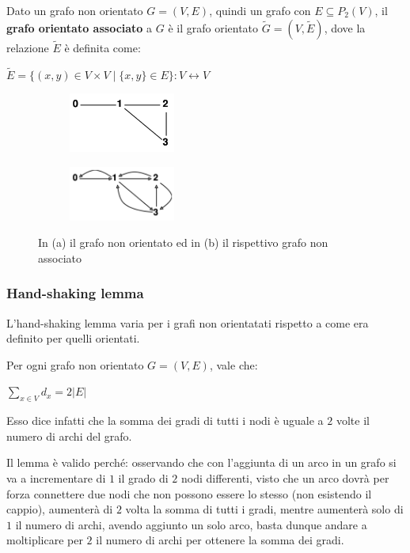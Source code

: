 \begin{definition}
    Dato un grafo non orientato $G = (V,E)$, quindi un grafo con $E \subseteq P_2(V)$, il \textbf{grafo orientato associato} a $G$ è il grafo orientato $\widetilde{G} = (V, \widetilde{E})$, dove la relazione $\widetilde{E}$ è definita come:
    \begin{center}
        $\widetilde{E} = \{(x,y) \in V \times V \mid \{x,y\} \in E\}: V \leftrightarrow V$
    \end{center}
\end{definition}

\begin{figure}[h!]
    \centering
    \begin{subfigure}{.3\textwidth}
        \centering
        \includegraphics[width=3.5cm]{images/grafo-non-orientato.png}
        \vspace{-5pt}
        \caption{}
    \end{subfigure}
    \hspace{1cm}
    \begin{subfigure}{.3\textwidth}
        \centering
        \includegraphics[width=3.5cm]{images/grafo-orientato-associato.png}
        \vspace{-5pt}
        \caption{}
    \end{subfigure}
    \caption{In (a) il grafo non orientato ed in (b) il rispettivo grafo non associato}
\end{figure}

\subsubsection{Hand-shaking lemma}
	L'hand-shaking lemma varia per i grafi non orientatati rispetto a come era definito per quelli orientati.
\begin{lemma}
    Per ogni grafo non orientato $G = (V,E)$, vale che:
    \begin{center}
        $\sum\limits_{x \in V}d_x = 2\lvert E\rvert$
    \end{center}
    Esso dice infatti che la somma dei gradi di tutti i nodi è uguale a $2$ volte il numero di archi del grafo. 
\end{lemma}
Il lemma è valido perché: osservando che con l'aggiunta di un arco in un grafo si va a incrementare di $1$ il grado di $2$ nodi differenti, visto che un arco dovrà per forza connettere due nodi che non possono essere lo stesso (non esistendo il cappio), aumenterà di $2$ volta la somma di tutti i gradi, mentre aumenterà solo di $1$ il numero di archi, avendo aggiunto un solo arco, basta dunque andare a moltiplicare per $2$ il numero di archi per ottenere la somma dei gradi.

